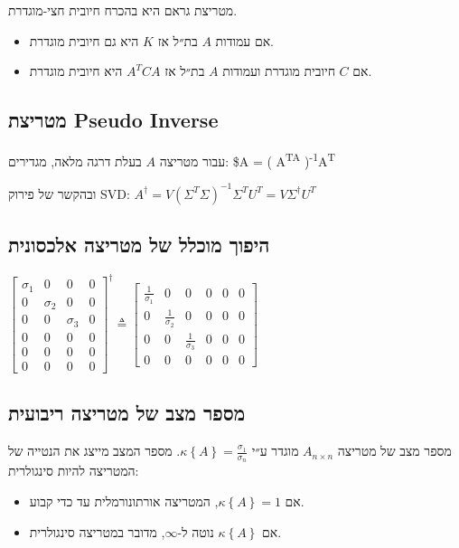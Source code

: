 \documentclass[11pt]{article}
\begin{document}
מטריצת גראם היא בהכרח חיובית חצי-מוגדרת.

\begin{itemize}
\item אם עמודות \(A\) בת״ל אז \(K\) היא גם חיובית מוגדרת.

\item אם \(C\) חיובית מוגדרת  ועמודות \(A\) בת״ל אז \(A^TCA\) היא חיובית מוגדרת.
\end{itemize}

\subsection{מטריצת Pseudo Inverse}
\label{sec:orgcdc3f6b}
עבור מטריצה \(A\) בעלת דרגה מלאה, מגדירים: \$A\textsuperscript{\textdagger{}} = \left( A\textsuperscript{TA} \right)\textsuperscript{-1}A\textsuperscript{T}

ובהקשר של פירוק SVD: \(A^{\dagger} = V \left( \Sigma^T\Sigma \right)^{-1} \Sigma^T U^T = V \Sigma^{\dagger}U^T\)

\subsection{היפוך מוכלל של מטריצה אלכסונית}
\label{sec:org583cdb9}

\(\begin{bmatrix}
\sigma_{1}  & 0 & 0 & 0 \\
0           & \sigma_{2} & 0 & 0 \\
0           & 0 & \sigma_{3} & 0 \\
0           & 0 & 0 & 0 \\
0           & 0 & 0 & 0 \\
0           & 0 & 0 & 0
 \end{bmatrix}^{\dagger} \triangleq \begin{bmatrix}
\frac{1}{\sigma_{1}}  & 0 & 0 & 0 & 0 & 0 \\
0           & \frac{1}{\sigma_{2}} & 0 & 0 & 0 & 0 \\
0           & 0 & \frac{1}{\sigma_{3}} & 0 & 0 & 0 \\
0           & 0 & 0 & 0 & 0 & 0
 \end{bmatrix}\)

\subsection{מספר מצב של מטריצה ריבועית}
\label{sec:org4fae357}
מספר מצב של מטריצה \(A_{n \times n}\) מוגדר ע״י \(\kappa \left\{ A \right\} = \frac{\sigma_1}{\sigma_n}\).
מספר המצב מייצג את הנטייה של המטריצה להיות סינגולרית:
\begin{itemize}
\item אם \(\kappa \left\{ A \right\} = 1\), המטריצה אורתונורמלית עד כדי קבוע.
\item אם \(\kappa \left\{ A \right\}\) נוטה ל-\(\infty\), מדובר במטריצה סינגולרית.
\end{itemize}
\end{document}
